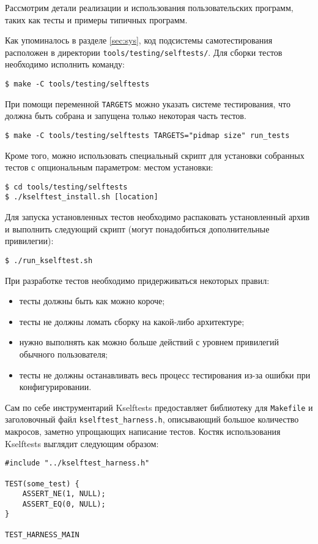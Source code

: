Рассмотрим детали реализации и использования пользовательских программ, таких
как тесты и примеры типичных программ.

Как упоминалось в разделе \ref{sec:sys}, код подсистемы самотестирования
расположен в директории \texttt{tools/testing/selftests/}. Для сборки тестов
необходимо исполнить команду:
\medskip
\begin{lstlisting}[style=cstyle]
$ make -C tools/testing/selftests
\end{lstlisting}
\medskip

При помощи переменной \texttt{TARGETS} можно указать системе тестирования, что
должна быть собрана и запущена только некоторая часть тестов.
\medskip
\begin{lstlisting}[style=cstyle]
$ make -C tools/testing/selftests TARGETS="pidmap size" run_tests
\end{lstlisting}
\medskip

Кроме того, можно использовать специальный скрипт для установки собранных тестов
с опциональным параметром: местом установки:
\medskip
\begin{lstlisting}[style=cstyle]
$ cd tools/testing/selftests
$ ./kselftest_install.sh [location]
\end{lstlisting}
\medskip

Для запуска установленных тестов необходимо распаковать установленный архив и
выполнить следующий скрипт (могут понадобиться дополнительные привилегии):
\medskip
\begin{lstlisting}[style=cstyle]
$ ./run_kselftest.sh
\end{lstlisting}
\medskip

При разработке тестов необходимо придерживаться некоторых правил:
\begin{itemize}
\item тесты должны быть как можно короче;
\item тесты не должны ломать сборку на какой-либо архитектуре;
\item нужно выполнять как можно больше действий с уровнем привилегий обычного
  пользователя;
\item тесты не должны останавливать весь процесс тестирования из-за ошибки при
  конфигурировании.
\end{itemize}

Сам по себе инструментарий Kselftests предоставляет библиотеку для \texttt{Makefile} и заголовочный файл
\texttt{kselftest\_harness.h}, описывающий большое количество макросов, заметно
упрощающих написание тестов. Костяк использования Kselftests выглядит следующим
образом:
\medskip
\begin{lstlisting}[style=cstyle]
#include "../kselftest_harness.h"

TEST(some_test) {
	ASSERT_NE(1, NULL);
	ASSERT_EQ(0, NULL);
}

TEST_HARNESS_MAIN
\end{lstlisting}
\medskip

